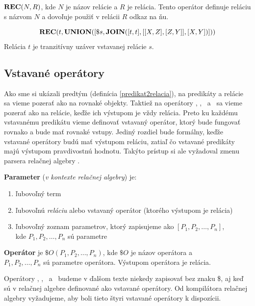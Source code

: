 \vline

$\textbf{REC}(N, R)$, kde $N$ je názov relácie a $R$ je relácia. Tento operátor definuje reláciu s názvom
$N$ a dovoľuje použiť v relácii $R$ odkaz na ňu.
\begin{priklad}
    \begin{center}
        $$\textbf{REC} ( t, \textbf{UNION} ( [ \$s, \textbf{JOIN} ( [t, t], [[X, Z], [Z, Y]], [X, Y] ) ] ) )$$ Relácia $t$ je
        tranzitívny uzáver vstavanej relácie $s$.
    \end{center}
\end{priklad}

\subsection{Vstavané operátory}
Ako sme si ukázali predtým (definícia \ref{predikat2relacia}), na predikáty a relácie sa vieme
pozerať ako na rovnaké objekty. Taktiež na operátory \JOIN, \ANTIJOIN, \UNION\ a \REC\ sa vieme
pozerať ako na relácie, keďže ich výstupom je vždy relácia. Preto ku každému vstavanému predikátu
vieme definovať vstavaný operátor, ktorý bude fungovať rovnako a bude mať rovnaké vstupy. Jediný
rozdiel bude formálny, keďže vstavané operátory budú mať výstupom reláciu, zatiaľ čo vstavané
predikáty majú výstupom pravdivostnú hodnotu. Takýto prístup si ale vyžadoval zmenu parsera relačnej
algebry \cite{RAcompilator}.

\newpage

\begin{definition}
    \textbf{Parameter} (\textit{v kontexte relačnej algebry}) je:
    \begin{enumerate}
        \item ľubovoľný term
        \item ľubovoľnú \textit{reláciu} alebo vstavaný operátor (ktorého výstupom je relácia)
        \item ľubovoľný zoznam parametrov, ktorý zapisujeme ako $[P_1, P_2, \dots, P_n]$,\\ kde
        $P_1, P_2, \dots, P_n$ sú parametre
    \end{enumerate}
\end{definition}

\begin{definition}
    \textbf{Operátor} je $\$O(P_1, P_2, \dots, P_n)$, kde $\$O$ je názov operátora a \\$P_1, P_2,
    \dots, P_n$ sú parametre operátora. Výstupom operátora je relácia.
\end{definition}

Operátory \JOIN, \ANTIJOIN, \UNION\ a \REC\ budeme v ďalšom texte niekedy zapisovať bez znaku \$, aj
keď sú v relačnej algebre definované ako vstavané operátory. Od kompilátora relačnej algebry
vyžadujeme, aby boli tieto štyri vstavané operátory k dispozícii.